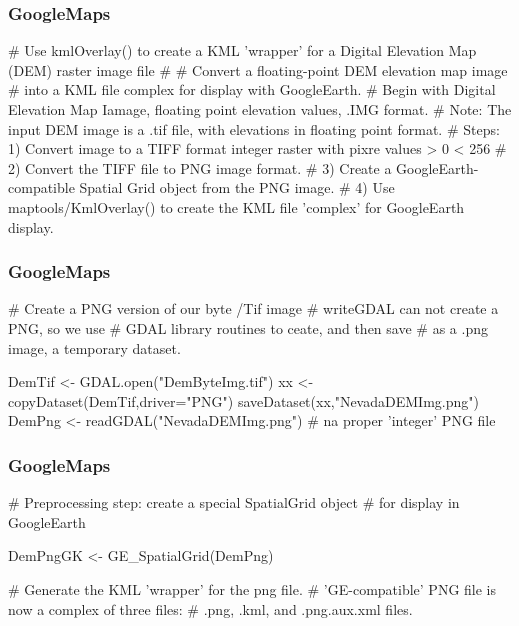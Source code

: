 \documentclass{beamer}
\begin{document}
\begin{frame}[fragile]
\frametitle{GoogleMaps}
# Use kmlOverlay() to create a KML 'wrapper' for a Digital Elevation Map (DEM) raster image file
# 
# Convert a floating-point DEM elevation map image 
# into a KML file complex for display with GoogleEarth.
# Begin with Digital Elevation Map Iamage, floating point elevation values, .IMG format.
# Note: The input DEM image is a .tif file, with elevations in floating point format.
# Steps: 1) Convert image to a TIFF format integer raster with pixre values > 0 < 256
#        2) Convert the TIFF file to PNG image format.
#        3) Create a GoogleEarth-compatible Spatial Grid object from the PNG image.
#        4) Use maptools/KmlOverlay() to create the KML file 'complex' for GoogleEarth display.
\end{frame}
\begin{frame}[fragile]
\frametitle{GoogleMaps}

# Create a PNG version of our byte /Tif image
# writeGDAL can not create a PNG, so we use 
# GDAL library routines to ceate, and then save
# as a .png image, a temporary dataset.

   DemTif <- GDAL.open("DemByteImg.tif")
   xx <- copyDataset(DemTif,driver="PNG") 
   saveDataset(xx,"NevadaDEMImg.png")     
   DemPng <- readGDAL("NevadaDEMImg.png")  # na proper 'integer' PNG file
\end{frame}
\begin{frame}[fragile]
\frametitle{GoogleMaps}

 # Preprocessing step: create a special SpatialGrid object
 # for display in GoogleEarth

   DemPngGK <- GE_SpatialGrid(DemPng)

# Generate the KML 'wrapper' for the png file.
# 'GE-compatible' PNG file is now a complex of three files:
# .png, .kml, and .png.aux.xml files.
\end{frame}
\end{document}
